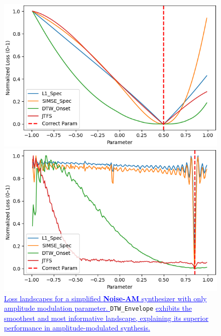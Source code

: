 \documentclass[lettersize,journal]{IEEEtran}
\renewcommand{\DIFadd}[1]{\textcolor{blue}{\uline{#1}}}
\newcommand{\SIMSESpec}{\texttt{SIMSE\_Spec}}
\newcommand{\LoneSpec}{\texttt{L1\_Spec}}
\newcommand{\JTFS}{\texttt{JTFS}}
\newcommand{\DTWEnv}{\texttt{DTW\_Envelope}}
\newcommand{\BPNoise}{\textbf{BP-Noise}}
\newcommand{\AmpMod}{\textbf{Noise-AM}}
\providecommand{\DIFadd}[1]{{\protect\color{blue}\uwave{#1}}} %
\providecommand{\DIFaddFL}[1]{\DIFadd{#1}} %
\begin{document}
\begin{figure}[ht]
    \centering
    \begin{minipage}[t]{0.48\textwidth}
        \centering
        \includegraphics[width=\linewidth]{images/experiment_plots/comparing_loss_landscapes_normalized.png}
        \caption{\DIFaddFL{Loss landscapes for \BPNoise{} with only a high-pass filter parameter. 
        }\LoneSpec{}\DIFaddFL{, }\SIMSESpec{}\DIFaddFL{, and \JTFS{} show clear global minima near the correct parameter, while }\DTWEnv{} \DIFaddFL{remains flat around the target.}}
        \label{fig:loss_landscape_noisebp}
    \end{minipage}%
    \hfill
    \begin{minipage}[t]{0.48\textwidth}
        \centering
        \includegraphics[width=\linewidth]{images/experiment_plots/comparing_lanscapes_1_1d_normalized.png}
        \caption{\DIFaddFL{Loss landscapes for a simplified \AmpMod{} synthesizer with only amplitude modulation parameter. 
        }\DTWEnv{} \DIFaddFL{exhibits the smoothest and most informative landscape, explaining its superior performance in amplitude-modulated synthesis.}}
        \label{fig:loss_landscape_ampmod}
    \end{minipage}
\end{figure}
\end{document}
